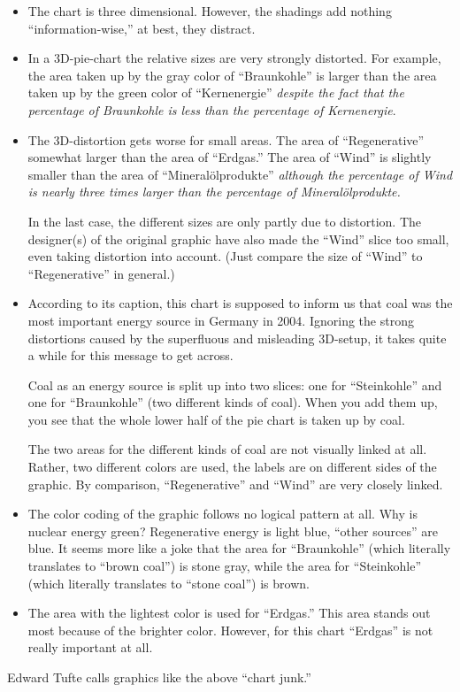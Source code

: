 \begin{itemize}
\item
  The chart is three dimensional. However, the shadings add
  nothing ``information-wise,'' at best, they distract.
\item
  In a 3D-pie-chart the relative sizes are very strongly
  distorted. For example, the area taken up by the gray color of ``Braunkohle''
  is larger than the area taken up by the green color of
  ``Kernenergie'' \emph{despite the fact that the percentage of
    Braunkohle is less than the percentage of Kernenergie}.
\item
  The 3D-distortion gets worse for small areas. The area of
  ``Regenerative'' somewhat larger  than the area of ``Erdgas.''  
  The area of ``Wind'' is slightly smaller than the area of
  ``Mineral\"olprodukte'' \emph{although the percentage of Wind is
    nearly three times larger than the percentage of
    Mineral\"olprodukte.}

  In the last case, the different sizes are only partly due to
  distortion. The designer(s) of the original graphic have also made
  the ``Wind'' slice too small, even taking distortion into
  account. (Just compare the size of ``Wind'' to ``Regenerative'' in
  general.) 
\item
  According to its caption, this chart is supposed to inform us that
  coal was the most important energy source in Germany in
  2004. Ignoring the strong distortions caused by the superfluous and
  misleading 3D-setup, it takes quite a while for this message to get
  across. 

  Coal as an energy source is split up into two slices: one for
  ``Steinkohle'' and one for ``Braunkohle'' (two different kinds of
  coal). When you add them up, you see that the whole lower half of
  the pie chart is taken up by coal.

  The two areas for the different kinds of coal are not visually
  linked at all. Rather, two different colors are used, the labels are
  on different sides of the graphic. By comparison, ``Regenerative''
  and ``Wind'' are very closely linked.
\item
  The color coding of the graphic follows no logical pattern at
  all. Why is nuclear energy green? Regenerative energy is light blue,
  ``other sources'' are blue. It seems more like a joke that the area
  for ``Braunkohle'' (which literally translates to ``brown coal'') is
  stone gray, while the area for ``Steinkohle'' (which literally
  translates to ``stone coal'') is brown.
\item
  The area with the lightest color is used for ``Erdgas.'' This area
  stands out most because of the brighter color. However, for this
  chart ``Erdgas'' is not really important at all.
\end{itemize}
Edward Tufte calls graphics like the above ``chart junk.'' 

